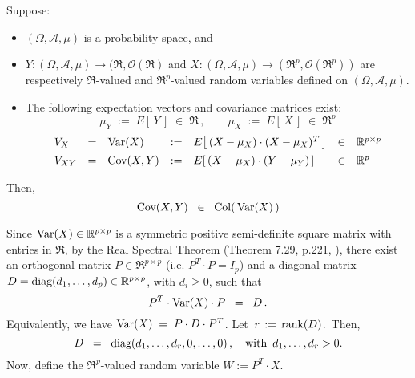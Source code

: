 
\begin{lemma}
\mbox{}\vskip 0.1cm
\noindent
Suppose:
\begin{itemize}
\item
	$(\Omega,\mathcal{A},\mu)$ is a probability space, and
\item
	$Y : (\Omega,\mathcal{A},\mu) \longrightarrow (\Re,\mathcal{O}(\Re)$
	and
	$X : (\Omega,\mathcal{A},\mu) \longrightarrow (\Re^{p},\mathcal{O}(\Re^{p}))$
	are respectively $\Re$-valued and $\Re^{p}$-valued random variables
	defined on $(\Omega,\mathcal{A},\mu)$.
\item
	The following expectation vectors and covariance matrices exist:
	\begin{equation*}
	\mu_{Y} \;:=\; E\!\left[\,Y\,\right] \;\in\; \Re\,,
	\quad\quad
	\mu_{X} \;:=\; E\!\left[\,X\,\right] \;\in\; \Re^{p}
	\end{equation*}
	\begin{equation*}
	\begin{array}{lclclcl}
	V_{X}
		&=& \Var\!\left(X\right)
		&:=& E\!\left[\,(X-\mu_{X}) \cdot (X-\mu_{X})^{T}\,\right]
		&\in& \Re^{p \times p}
	\\
	V_{XY}
		&\overset{{\color{white}\vert}}{=}& \Cov\!\left(X,Y\right)
		&:=& E\!\left[\,(X-\mu_{X}) \cdot (Y-\mu_{Y})\,\right]
		&\in& \Re^{p}
	\end{array}
	\end{equation*}
\end{itemize}
Then,
\begin{equation*}
\textnormal{Cov}(X,Y) \;\; \in \;\; \textnormal{Col}\!\left(\,\textnormal{Var}(X)\,\right)
\end{equation*}
\end{lemma}
\proof
Since $\textnormal{Var}(X) \in \mathbb{R}^{p \times p}$ is a symmetric positive semi-definite
square matrix with entries in $\Re$, by the Real Spectral Theorem
(Theorem 7.29, p.221, \cite{Axler2015}), there exist an
orthogonal matrix $P \in \Re^{p \times p}$ (i.e. $P^{T} \cdot P = I_{p}$) and
a diagonal matrix $D = \textnormal{diag}(d_{1},\ldots,d_{p})\in \mathbb{R}^{p \times p}$,
with $d_{i} \geq 0$, such that
\begin{equation*}
P^{T} \cdot \textnormal{Var}(X) \cdot P \;\;=\;\; D \,.
\end{equation*}
Equivalently, we have $\textnormal{Var}(X) \;=\; P \cdot D \cdot P^{T}$.
Let \,$r \,:=\, \textnormal{rank}(D)$.\, Then,
\begin{equation*}
D \;\; = \;\; \textnormal{diag}(d_{1},\ldots,d_{r},0,\ldots,0)\,,
\quad
\textnormal{with \,$d_{1}, \ldots, d_{r} > 0$}.
\end{equation*}
Now, define the $\Re^{p}$-valued random variable $W := P^{T} \cdot X$.

